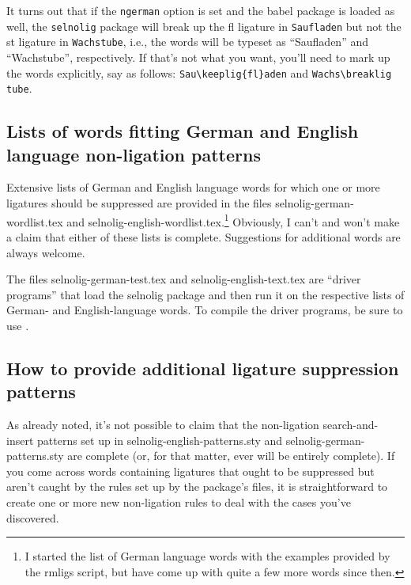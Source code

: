 \documentclass[12pt]{article}
\newcommand{\pkg}[1]{\textsf{#1}}
\newcommand{\opt}[1]{\texttt{#1}}
\begin{document}
It turns out that if the \opt{ngerman} option is set and the \pkg{babel} package is loaded as well, the \opt{selnolig} package will break up the fl ligature in \opt{Saufladen} but not the st ligature in \opt{Wachstube}, i.e., the words will be typeset as \enquote{Saufladen} and \enquote{Wachstube}, respectively. If that's not what you want, you'll need to mark up the words explicitly, say as follows: \Verb+Sau\keeplig{fl}aden+ and \Verb+Wachs\breaklig tube+. 



\subsection{Lists of words fitting German and English language non-ligation patterns}

Extensive lists of German and English language words for which one or more ligatures should be suppressed are provided in the files \pkg{selnolig-german-wordlist.tex} and \pkg{selnolig-english-wordlist.tex}.\footnote{I started the list of German language words with the examples provided by the \pkg{rmligs} script, but have come up with quite a few more words since then.} Obviously, I can't and won't make a claim that either of these lists is complete. Suggestions for additional words are always welcome.

The files \pkg{selnolig-german-test.tex} and \pkg{selnolig-english-text.tex} are \enquote{driver programs} that load the \pkg{selnolig} package and then run it on the respective lists of German- and English-language words. To compile the driver programs, be sure to use \LuaLaTeX.


\subsection{How to provide additional ligature suppression patterns}

As already noted, it's not possible to claim that the non-ligation search-and-insert patterns set up in \pkg{selnolig-english-patterns.sty} and \pkg{selnolig-german-patterns.sty} are complete (or, for that matter, ever will be entirely complete). If you come across words containing ligatures that ought to be suppressed but aren't caught by the rules set up by the package's files, it is straightforward to create one or more new non-ligation rules to deal with the cases you've discovered.
\end{document}
